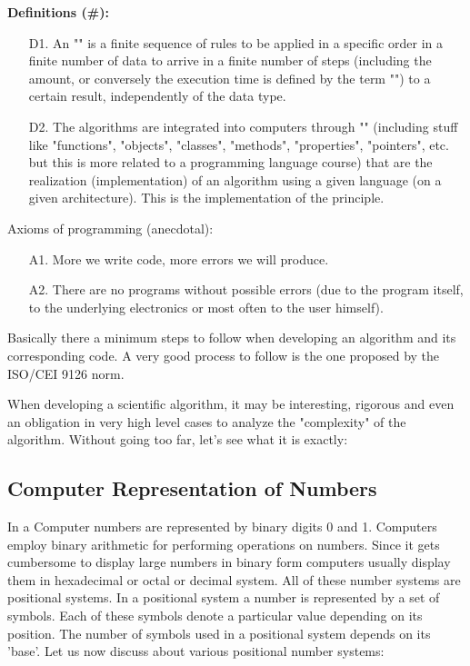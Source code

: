 	\textbf{Definitions (\#\mydef):}
	\begin{enumerate}
		\item[D1.]  An "" is a finite sequence of rules to be applied in a specific order in a finite number of data to arrive in a finite number of steps (including the amount, or conversely the execution time is defined by the term "") to a certain result, independently of the data type.
		
		\item[D2.] The algorithms are integrated into computers through "" (including stuff like "functions", "objects", "classes", "methods", "properties", "pointers", etc. but this is more related to a programming language course) that are the realization (implementation) of an algorithm using a given language (on a given architecture). This is the implementation of the principle.
	\end{enumerate}
	
	Axioms of programming (anecdotal):

	\begin{enumerate}
		\item[A1.] More we write code, more errors we will produce.
		
		\item[A2.] There are no programs without possible errors (due to the program itself, to the underlying electronics or most often to the user himself).
	\end{enumerate}
	
	\begin{tcolorbox}[title=Remarks,colframe=black,arc=10pt]
Basically there a minimum steps to follow when developing an algorithm and its corresponding code. A very good process to follow is the one proposed by the ISO/CEI 9126 norm.
	\end{tcolorbox}	

	When developing a scientific algorithm, it may be interesting, rigorous and even an obligation in very high level cases to analyze the "complexity" of the algorithm. Without going too far, let's see what it is exactly:
	
	\subsection{Computer Representation of Numbers}
	
	In a Computer numbers are represented by binary digits 0 and 1.
	Computers employ binary arithmetic for performing operations on
	numbers. Since it gets cumbersome to display large numbers in
	binary form computers usually display them in hexadecimal or octal
	or decimal system. All of these number systems are positional
	systems. In a positional system a number is represented by a set
	of symbols. Each of these symbols denote a particular value
	depending on its position. The number of symbols  used in a
	positional system depends on its 'base'. Let us now discuss about
	various positional number systems:
	
